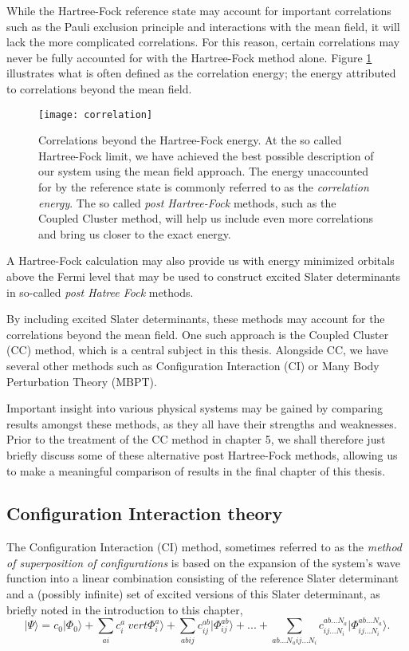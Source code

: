 While the Hartree-Fock reference state may account for important
correlations such as the Pauli exclusion principle and interactions
with the mean field, it will lack the more complicated correlations. For this reason, certain correlations may never
be fully accounted for with the Hartree-Fock method alone. Figure
\ref{fig:correlation} illustrates what is often defined as the
correlation energy; the energy attributed to correlations beyond the
mean field.
\begin{figure}[p]
    \centering
    \texttt{[image: correlation]}
    \caption{Correlations beyond the Hartree-Fock energy. At the so
      called Hartree-Fock limit, we have achieved the best possible
      description of our system using the mean field approach. The
      energy unaccounted for by the reference state is commonly
      referred to as the \emph{correlation energy}. The so called
      \emph{post Hartree-Fock} methods, such as the Coupled Cluster
      method, will help us include even more correlations and bring us
      closer to the exact energy.}
    \label{fig:correlation}
\end{figure}

A Hartree-Fock calculation may also provide us with energy minimized orbitals above the Fermi level that may be used to construct excited Slater determinants in so-called \emph{post Hatree Fock} methods. 

By including excited Slater determinants, these methods may
account for the correlations beyond the mean field. One such approach is the Coupled Cluster (CC) method, which
is a central subject in this thesis. Alongside CC, we have several
other methods such as Configuration Interaction (CI) or Many Body
Perturbation Theory (MBPT).

Important insight into various physical systems may be gained by
comparing results amongst these methods, as they all have their
strengths and weaknesses. Prior to the treatment of the CC method in
chapter 5, we shall therefore just briefly discuss some of these
alternative post Hartree-Fock methods, allowing us to make a meaningful comparison of
results in the final chapter of this thesis.

\subsection{Configuration Interaction theory}

The Configuration Interaction (CI) method, sometimes referred to as
the \emph{method of superposition of configurations} \cite{Harris} is
based on the expansion of the system's wave function into a linear
combination consisting of the reference Slater determinant and a
(possibly infinite) set of excited versions of this Slater
determinant, as briefly noted in the introduction to this chapter,
\begin{equation}
\vert \Psi \rangle = c_0 \vert \Phi_0 \rangle + \sum_{ai} c^{a}_i\ vert \Phi_i^a \rangle +  \sum_{abij} c^{ab}_{ij} \vert \Phi_{ij}^{ab} \rangle + ... + \sum_{ab...N_a ij...N_i} c^{ab...N_a}_{ij...N_i} \vert \Phi_{ij...N_i}^{ab...N_a} \rangle.
\label{eqn:fullCI}
\end{equation}

